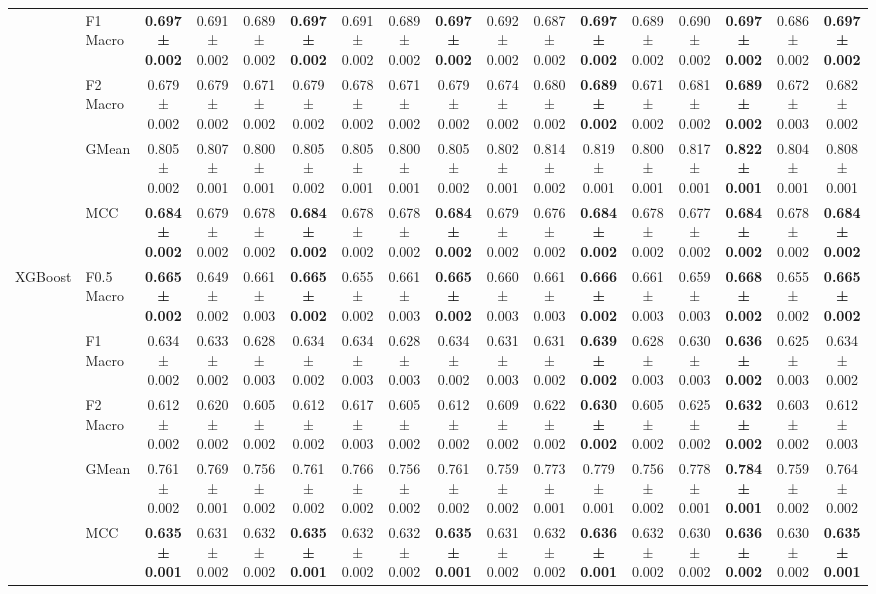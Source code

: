 \begin{table}[H]
{\begin{tabular}{llccccccccccccccc}
 & F1 Macro & \textbf{0.697 ± 0.002} & 0.691 ± 0.002 & 0.689 ± 0.002 & \textbf{0.697 ± 0.002} & 0.691 ± 0.002 & 0.689 ± 0.002 & \textbf{0.697 ± 0.002} & 0.692 ± 0.002 & 0.687 ± 0.002 & \textbf{0.697 ± 0.002} & 0.689 ± 0.002 & 0.690 ± 0.002 & \textbf{0.697 ± 0.002} & 0.686 ± 0.002 & \textbf{0.697 ± 0.002} \\
 & F2 Macro & 0.679 ± 0.002 & 0.679 ± 0.002 & 0.671 ± 0.002 & 0.679 ± 0.002 & 0.678 ± 0.002 & 0.671 ± 0.002 & 0.679 ± 0.002 & 0.674 ± 0.002 & 0.680 ± 0.002 & \textbf{0.689 ± 0.002} & 0.671 ± 0.002 & 0.681 ± 0.002 & \textbf{0.689 ± 0.002} & 0.672 ± 0.003 & 0.682 ± 0.002 \\
 & GMean & 0.805 ± 0.002 & 0.807 ± 0.001 & 0.800 ± 0.001 & 0.805 ± 0.002 & 0.805 ± 0.001 & 0.800 ± 0.001 & 0.805 ± 0.002 & 0.802 ± 0.001 & 0.814 ± 0.002 & 0.819 ± 0.001 & 0.800 ± 0.001 & 0.817 ± 0.001 & \textbf{0.822 ± 0.001} & 0.804 ± 0.001 & 0.808 ± 0.001 \\
 & MCC & \textbf{0.684 ± 0.002} & 0.679 ± 0.002 & 0.678 ± 0.002 & \textbf{0.684 ± 0.002} & 0.678 ± 0.002 & 0.678 ± 0.002 & \textbf{0.684 ± 0.002} & 0.679 ± 0.002 & 0.676 ± 0.002 & \textbf{0.684 ± 0.002} & 0.678 ± 0.002 & 0.677 ± 0.002 & \textbf{0.684 ± 0.002} & 0.678 ± 0.002 & \textbf{0.684 ± 0.002} \\
\cline{1-17}
\multirow[t]{5}{*}{XGBoost} & F0.5 Macro & \textbf{0.665 ± 0.002} & 0.649 ± 0.002 & 0.661 ± 0.003 & \textbf{0.665 ± 0.002} & 0.655 ± 0.002 & 0.661 ± 0.003 & \textbf{0.665 ± 0.002} & 0.660 ± 0.003 & 0.661 ± 0.003 & \textbf{0.666 ± 0.002} & 0.661 ± 0.003 & 0.659 ± 0.003 & \textbf{0.668 ± 0.002} & 0.655 ± 0.002 & \textbf{0.665 ± 0.002} \\
 & F1 Macro & 0.634 ± 0.002 & 0.633 ± 0.002 & 0.628 ± 0.003 & 0.634 ± 0.002 & 0.634 ± 0.003 & 0.628 ± 0.003 & 0.634 ± 0.002 & 0.631 ± 0.003 & 0.631 ± 0.002 & \textbf{0.639 ± 0.002} & 0.628 ± 0.003 & 0.630 ± 0.003 & \textbf{0.636 ± 0.002} & 0.625 ± 0.003 & 0.634 ± 0.002 \\
 & F2 Macro & 0.612 ± 0.002 & 0.620 ± 0.002 & 0.605 ± 0.002 & 0.612 ± 0.002 & 0.617 ± 0.003 & 0.605 ± 0.002 & 0.612 ± 0.002 & 0.609 ± 0.002 & 0.622 ± 0.002 & \textbf{0.630 ± 0.002} & 0.605 ± 0.002 & 0.625 ± 0.002 & \textbf{0.632 ± 0.002} & 0.603 ± 0.002 & 0.612 ± 0.003 \\
 & GMean & 0.761 ± 0.002 & 0.769 ± 0.001 & 0.756 ± 0.002 & 0.761 ± 0.002 & 0.766 ± 0.002 & 0.756 ± 0.002 & 0.761 ± 0.002 & 0.759 ± 0.002 & 0.773 ± 0.001 & 0.779 ± 0.001 & 0.756 ± 0.002 & 0.778 ± 0.001 & \textbf{0.784 ± 0.001} & 0.759 ± 0.002 & 0.764 ± 0.002 \\
 & MCC & \textbf{0.635 ± 0.001} & 0.631 ± 0.002 & 0.632 ± 0.002 & \textbf{0.635 ± 0.001} & 0.632 ± 0.002 & 0.632 ± 0.002 & \textbf{0.635 ± 0.001} & 0.631 ± 0.002 & 0.632 ± 0.002 & \textbf{0.636 ± 0.001} & 0.632 ± 0.002 & 0.630 ± 0.002 & \textbf{0.636 ± 0.002} & 0.630 ± 0.002 & \textbf{0.635 ± 0.001} \\
\cline{1-17}
\bottomrule
\end{tabular}
    }
\end{table}
